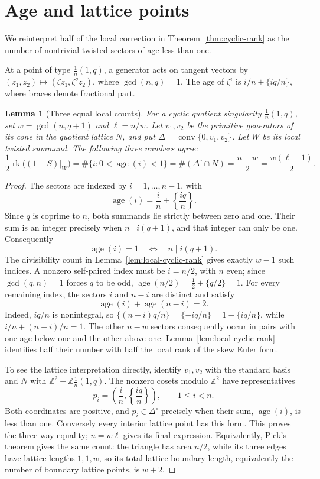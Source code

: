 \documentclass[11pt]{article}
\theoremstyle{plain}
\newtheorem{lemma}[theorem]{Lemma}
\theoremstyle{definition}
\theoremstyle{remark}
\newcommand{\rk}{\operatorname{rk}}
\newcommand{\Z}{\mathbb Z}
\newcommand{\1}{\mathbf 1}
\begin{document}
\section{Age and lattice points}\label{sec:age}

We reinterpret half of the local correction in Theorem~\ref{thm:cyclic-rank} as the number of nontrivial twisted sectors of age less than one.

At a point of type $\frac1n(1,q)$, a generator acts on tangent vectors by $(z_1,z_2)\mapsto(\zeta z_1,\zeta^qz_2)$, where $\gcd(n,q)=1$.  The age of $\zeta^i$ is $i/n+\{iq/n\}$, where braces denote fractional part.

\begin{lemma}[Three equal local counts]\label{lem:age-count}
For a cyclic quotient singularity $\frac1n(1,q)$, set $w=\gcd(n,q+1)$ and $\ell=n/w$.  Let $v_1,v_2$ be the primitive generators of its cone in the quotient lattice $N$, and put $\Delta=\operatorname{conv}\{0,v_1,v_2\}$.  Let $W$ be its local twisted summand.  The following three numbers agree:
\[
\frac12\rk\bigl((1-S)|_W\bigr)
=\#\{i:0<\operatorname{age}(i)<1\}
=\#(\Delta^\circ\cap N)
=\frac{n-w}{2}=\frac{w(\ell-1)}2.
\]
\end{lemma}

\begin{proof}
The sectors are indexed by $i=1,\dots,n-1$, with
\[
\operatorname{age}(i)
=\frac{i}{n}+\left\{\frac{iq}{n}\right\}.
\]
Since $q$ is coprime to $n$, both summands lie strictly between zero and one.  Their sum is an integer precisely when $n\mid i(q+1)$, and that integer can only be one.  Consequently
\[
\operatorname{age}(i)=1
\quad\Longleftrightarrow\quad
n\mid i(q+1).
\]
The divisibility count in Lemma~\ref{lem:local-cyclic-rank} gives exactly $w-1$ such indices.  A nonzero self-paired index must be $i=n/2$, with $n$ even; since $\gcd(q,n)=1$ forces $q$ to be odd, $\operatorname{age}(n/2)=\frac12+\{q/2\}=1$.  For every remaining index, the sectors $i$ and $n-i$ are distinct and satisfy
\[
\operatorname{age}(i)+\operatorname{age}(n-i)=2.
\]
Indeed, $iq/n$ is nonintegral, so $\{(n-i)q/n\}=\{-iq/n\}=1-\{iq/n\}$, while $i/n+(n-i)/n=1$.
The other $n-w$ sectors consequently occur in pairs with one age below one and the other above one.  Lemma~\ref{lem:local-cyclic-rank} identifies half their number with half the local rank of the skew Euler form.

To see the lattice interpretation directly, identify $v_1,v_2$ with the standard basis and $N$ with $\Z^2+\Z\frac1n(1,q)$.  The nonzero cosets modulo $\Z^2$ have representatives
\[
p_i=\left(\frac in,\left\{\frac{iq}{n}\right\}\right),\qquad 1\le i<n.
\]
Both coordinates are positive, and $p_i\in\Delta^\circ$ precisely when their sum, $\operatorname{age}(i)$, is less than one.  Conversely every interior lattice point has this form.  This proves the three-way equality; $n=w\ell$ gives its final expression.  Equivalently, Pick's theorem gives the same count: the triangle has area $n/2$, while its three edges have lattice lengths $1,1,w$, so its total lattice boundary length, equivalently the number of boundary lattice points, is $w+2$.
\end{proof}
\end{document}
